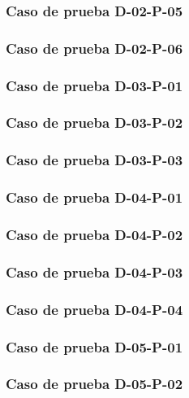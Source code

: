 \documentclass[10pt,a4paper]{article}
\begin{document}
			\subsubsection{Caso de prueba D-02-P-05}

			\subsubsection{Caso de prueba D-02-P-06}

			\subsubsection{Caso de prueba D-03-P-01}

			\subsubsection{Caso de prueba D-03-P-02}

			\subsubsection{Caso de prueba D-03-P-03}

			\subsubsection{Caso de prueba D-04-P-01}

			\subsubsection{Caso de prueba D-04-P-02}

			\subsubsection{Caso de prueba D-04-P-03}

			\subsubsection{Caso de prueba D-04-P-04}

			\subsubsection{Caso de prueba D-05-P-01}

			\subsubsection{Caso de prueba D-05-P-02}
\end{document}
